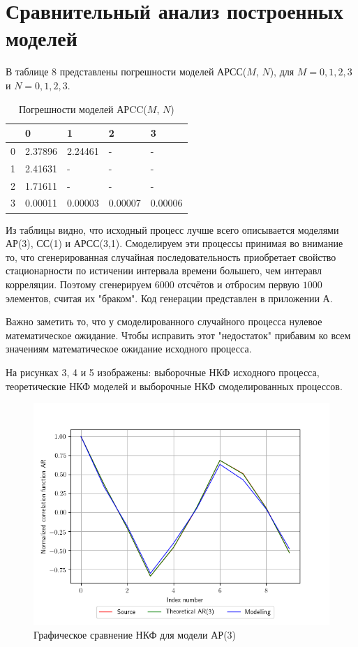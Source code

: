 \documentclass[12pt, fleqn]{article}
\begin{document}
{	\section{Сравнительный анализ построенных моделей}
	{
		В таблице 8 представлены погрешности моделей АРСС($M$, $N$), для $M = 0,1,2,3$ и $N = 0,1,2,3$.
		\begin{table}[H]
			\centering
			\caption{Погрешности моделей АРCC($M$, $N$)}
			\begin{tabularx}{0.8\textwidth}{ | Y | Y | Y | Y | Y | }
				\hline
				 & 0  & 1  & 2  & 3  \\               & 2.37896 & 2.24461 & - & - \\               & 2.41631 & - & - & - \\               & 1.71611 & - & - & - \\               & 0.00011 & 0.00003 & 0.00007 & 0.00006 \\ \hline  
			\end{tabularx}
		\end{table}
		Из таблицы видно, что исходный процесс лучше всего описывается моделями АР(3), СС(1) и АРСС(3,1). Смоделируем эти процессы принимая во внимание то, что сгенерированная случайная последовательность приобретает свойство стационарности по истичении интервала времени большего, чем интеравл корреляции. Поэтому сгенерируем $6000$ отсчётов и отбросим первую $1000$ элементов, считая их "браком". Код генерации представлен в приложении А.
			  
		Важно заметить то, что у смоделированного случайного процесса нулевое математическое ожидание. Чтобы исправить этот "недостаток" прибавим ко всем значениям математическое ожидание исходного процесса.
			  
		На рисунках 3, 4 и 5 изображены: выборочные НКФ исходного процесса, теоретические НКФ моделей и выборочные НКФ смоделированных процессов.
			  
		\begin{figure}[H]
			\includegraphics{plot_ar_ncf.png}
			\caption{Графическое сравнение НКФ для модели АР(3)}
		\end{figure}
		  	
}}
\end{document}
